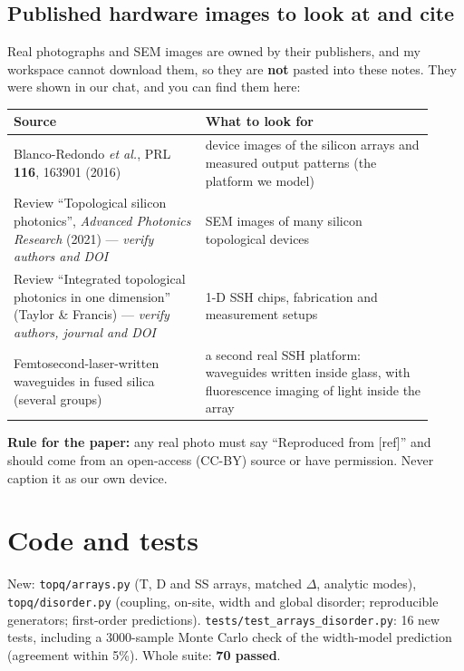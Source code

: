 \documentclass[10pt,a4paper]{article}
\begin{document}
\subsection{Published hardware images to look at and cite}
Real photographs and SEM images are owned by their publishers, and my workspace cannot download them, so they are \textbf{not} pasted into these notes. They were shown in our chat, and you can find them here:
\begin{tabular}{@{}p{0.42\linewidth}p{0.5\linewidth}@{}}\toprule
Source & What to look for\\\midrule
Blanco-Redondo \emph{et al.}, PRL \textbf{116}, 163901 (2016) & device images of the silicon arrays and measured output patterns (the platform we model)\\
Review ``Topological silicon photonics'', \emph{Advanced Photonics Research} (2021) --- \emph{verify authors and DOI} & SEM images of many silicon topological devices\\
Review ``Integrated topological photonics in one dimension'' (Taylor \& Francis) --- \emph{verify authors, journal and DOI} & 1-D SSH chips, fabrication and measurement setups\\
Femtosecond-laser-written waveguides in fused silica (several groups) & a second real SSH platform: waveguides written inside glass, with fluorescence imaging of light inside the array\\\bottomrule
\end{tabular}\par\smallskip\noindent\textbf{Rule for the paper:} any real photo must say ``Reproduced from [ref]'' and should come from an open-access (CC-BY) source or have permission. Never caption it as our own device.

\section{Code and tests}
New: \texttt{topq/arrays.py} (T, D and SS arrays, matched $\Delta$, analytic modes), \texttt{topq/disorder.py} (coupling, on-site, width and global disorder; reproducible generators; first-order predictions). \texttt{tests/test\_arrays\_disorder.py}: 16 new tests, including a 3000-sample Monte Carlo check of the width-model prediction (agreement within 5\%). Whole suite: \textbf{70 passed}.
\end{document}
